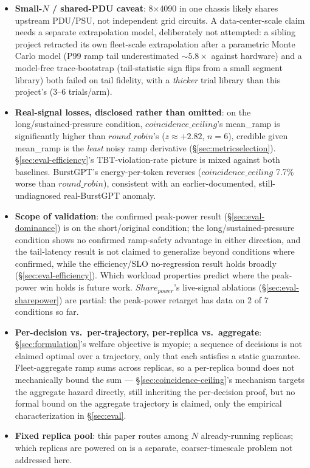 \documentclass[sigconf,review,anonymous]{acmart}
\begin{document}
\begin{itemize}
  \item \textbf{Small-$N$ / shared-PDU caveat}: 8$\times$4090 in one chassis likely shares
    upstream PDU/PSU, not independent grid circuits. A data-center-scale claim needs a separate
    extrapolation model, deliberately not attempted: a sibling project retracted its own
    fleet-scale extrapolation after a parametric Monte Carlo model (P99 ramp tail
    underestimated ${\sim}5.8\times$ against hardware) and a model-free trace-bootstrap
    (tail-statistic sign flips from a small segment library) both failed on tail fidelity, with
    a \emph{thicker} trial library than this project's (3--6 trials/arm).
  \item \textbf{Real-signal losses, disclosed rather than omitted}: on the long/sustained-pressure
    condition, $\mathit{coincidence\_ceiling}$'s mean\_ramp is significantly higher than
    $\mathit{round\_robin}$'s ($z{\approx}{+}2.82$, $n{=}6$), credible given mean\_ramp is the
    \emph{least} noisy ramp derivative (\S\ref{sec:metricselection}).
    \S\ref{sec:eval-efficiency}'s TBT-violation-rate picture is mixed against both baselines.
    BurstGPT's energy-per-token reverses ($\mathit{coincidence\_ceiling}$ 7.7\% worse than
    $\mathit{round\_robin}$), consistent with an earlier-documented, still-undiagnosed
    real-BurstGPT anomaly.
  \item \textbf{Scope of validation}: the confirmed peak-power result (\S\ref{sec:eval-dominance})
    is on the short/original condition; the long/sustained-pressure condition shows no
    confirmed ramp-safety advantage in either direction, and the tail-latency result is not
    claimed to generalize beyond conditions where confirmed, while the efficiency/SLO
    no-regression result holds broadly (\S\ref{sec:eval-efficiency}). Which workload
    properties predict where the peak-power win holds is future work.
    $\mathit{Share_{power}}$'s live-signal ablations (\S\ref{sec:eval-sharepower}) are partial:
    the peak-power retarget has data on 2 of 7 conditions so far.
  \item \textbf{Per-decision vs.\ per-trajectory, per-replica vs.\ aggregate}:
    \S\ref{sec:formulation}'s welfare objective is myopic; a sequence of decisions is not
    claimed optimal over a trajectory, only that each satisfies a static guarantee.
    Fleet-aggregate ramp sums across replicas, so a per-replica bound does not mechanically
    bound the sum --- \S\ref{sec:coincidence-ceiling}'s mechanism targets the aggregate hazard
    directly, still inheriting the per-decision proof, but no formal bound on the aggregate
    trajectory is claimed, only the empirical characterization in \S\ref{sec:eval}.
  \item \textbf{Fixed replica pool}: this paper routes among $N$ already-running replicas;
    which replicas are powered on is a separate, coarser-timescale problem not addressed here.
\end{itemize}
\end{document}
